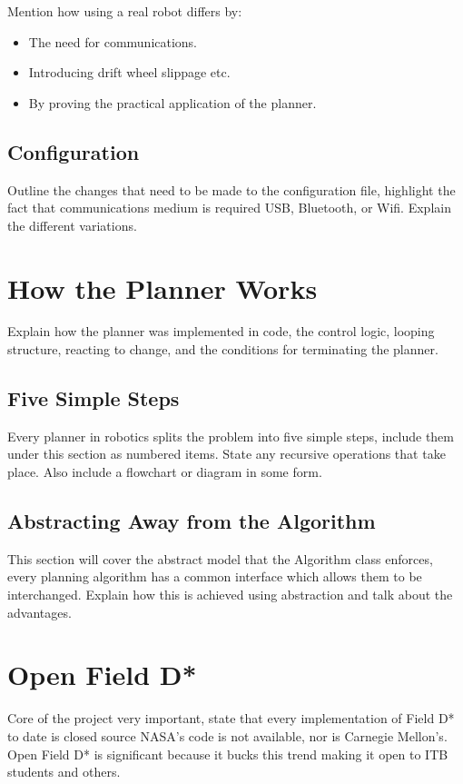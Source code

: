 Mention how using a real robot differs by:

\begin{itemize}
\item The need for communications.
\item Introducing drift wheel slippage etc.
\item By proving the practical application of the planner.
\end{itemize}

\subsection{Configuration}
Outline the changes that need to be made to the configuration file, highlight the fact that communications medium is required USB, Bluetooth, or Wifi. Explain the different variations.


\section{How the Planner Works}
Explain how the planner was implemented in code, the control logic, looping structure, reacting to change, and the conditions for terminating the planner.

\subsection{Five Simple Steps}
Every planner in robotics splits the problem into five simple steps, include them under this section as numbered items. State any recursive operations that take place. Also include a flowchart or diagram in some form.

\subsection{Abstracting Away from the Algorithm}
This section will cover the abstract model that the Algorithm class enforces, every planning algorithm has a common interface which allows them to be interchanged. Explain how this is achieved using abstraction and talk about the advantages.


\section{Open Field D*}
Core of the project very important, state that every implementation of Field D* to date is closed source NASA's code is not available, nor is Carnegie Mellon's. Open Field D* is significant because it bucks this trend making it open to ITB students and others.

